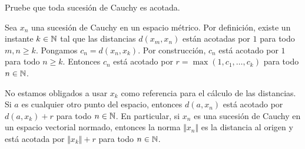 \begin{exercise}
Pruebe que toda sucesión de Cauchy es acotada.
\end{exercise}

\begin{solution}
Sea $x_n$ una sucesión de Cauchy en un espacio métrico. Por definición, existe un instante $k \in \mathbb N$ tal que las distancias $d(x_m, x_n)$ están acotadas por $1$ para todo $m, n \ge k$. Pongamos $c_n = d(x_n, x_k)$. Por construcción, $c_n$ está acotado por $1$ para todo $n \ge k$. Entonces $c_n$ está acotado por $r = \max(1, c_1, \dots, c_k)$ para todo $n \in \mathbb N$.

No estamos obligados a usar $x_k$ como referencia para el cálculo de las distancias. Si $a$ es cualquier otro punto del espacio, entonces $d(a, x_n)$ está acotado por $d(a, x_k) + r$ para todo $n \in \mathbb N$. En particular, si $x_n$ es una sucesión de Cauchy en un espacio vectorial normado, entonces la norma $\Vert x_n \Vert$ es la distancia al origen y está acotada por $\Vert x_k \Vert + r$ para todo $n \in \mathbb N$.
\end{solution}

